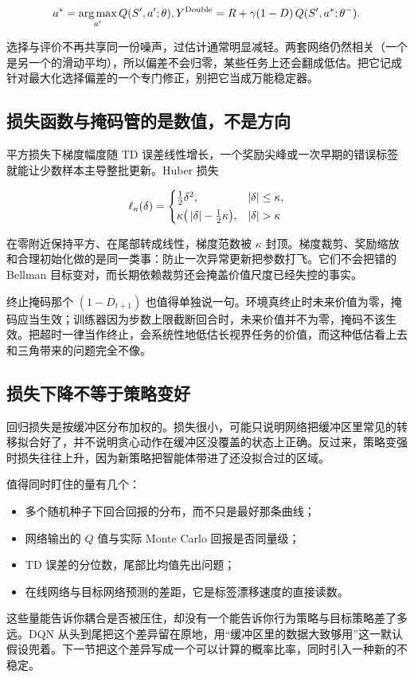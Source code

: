 \[
a^*=\operatorname*{arg\,max}_{a'}Q(S',a';\theta),
\space
Y^{\mathrm{Double}}=R+\gamma(1-D)\,Q(S',a^*;\theta^-).
\]

选择与评价不再共享同一份噪声，过估计通常明显减轻。两套网络仍然相关（一个是另一个的滑动平均），所以偏差不会归零，某些任务上还会翻成低估。把它记成针对最大化选择偏差的一个专门修正，别把它当成万能稳定器。

\subsection{损失函数与掩码管的是数值，不是方向}

平方损失下梯度幅度随 TD 误差线性增长，一个奖励尖峰或一次早期的错误标签就能让少数样本主导整批更新。Huber 损失

\[
\ell_\kappa(\delta)=
\begin{cases}
\tfrac12\delta^{2}, & \abs{\delta}\le\kappa,\\[2pt]
\kappa\big(\abs{\delta}-\tfrac12\kappa\big), & \abs{\delta}>\kappa
\end{cases}
\]

在零附近保持平方、在尾部转成线性，梯度范数被 \(\kappa\) 封顶。梯度裁剪、奖励缩放和合理初始化做的是同一类事：防止一次异常更新把参数打飞。它们不会把错的 Bellman 目标变对，而长期依赖裁剪还会掩盖价值尺度已经失控的事实。

终止掩码那个 \((1-D_{t+1})\) 也值得单独说一句。环境真终止时未来价值为零，掩码应当生效；训练器因为步数上限截断回合时，未来价值并不为零，掩码不该生效。把超时一律当作终止，会系统性地低估长视界任务的价值，而这种低估看上去和三角带来的问题完全不像。

\subsection{损失下降不等于策略变好}

回归损失是按缓冲区分布加权的。损失很小，可能只说明网络把缓冲区里常见的转移拟合好了，并不说明贪心动作在缓冲区没覆盖的状态上正确。反过来，策略变强时损失往往上升，因为新策略把智能体带进了还没拟合过的区域。

值得同时盯住的量有几个：

\begin{itemize}
\tightlist
\item 多个随机种子下回合回报的分布，而不只是最好那条曲线；
\item 网络输出的 \(Q\) 值与实际 Monte Carlo 回报是否同量级；
\item TD 误差的分位数，尾部比均值先出问题；
\item 在线网络与目标网络预测的差距，它是标签漂移速度的直接读数。
\end{itemize}

这些量能告诉你耦合是否被压住，却没有一个能告诉你行为策略与目标策略差了多远。DQN 从头到尾把这个差异留在原地，用``缓冲区里的数据大致够用''这一默认假设兜着。下一节把这个差异写成一个可以计算的概率比率，同时引入一种新的不稳定。
